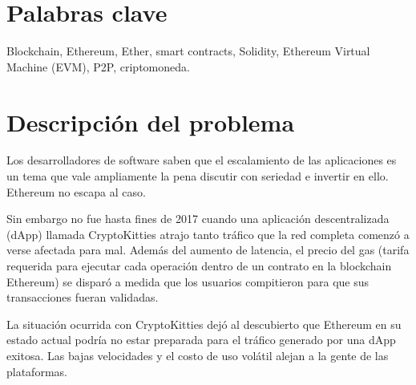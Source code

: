 \nomenclature[g-p]{$\pi$}{ $\simeq 3.14\ldots$}                                             %


\section{Palabras clave} %
Blockchain, Ethereum, Ether, smart contracts, Solidity, Ethereum Virtual Machine (EVM), P2P,
criptomoneda.

\section{Descripción del problema} %
Los desarrolladores de software saben que el escalamiento de las aplicaciones es un tema
que vale ampliamente la pena discutir con seriedad e invertir en ello. Ethereum no escapa
al caso.

Sin embargo no fue hasta fines de 2017 cuando una aplicación descentralizada (dApp) llamada
CryptoKitties atrajo tanto tráfico que la red completa comenzó a verse afectada para mal.
Además del aumento de latencia, el precio del gas (tarifa requerida para ejecutar cada
operación dentro de un contrato en la blockchain Ethereum) se disparó a medida que los
usuarios compitieron para que sus transacciones fueran validadas.

La situación ocurrida con CryptoKitties dejó al descubierto que Ethereum en su estado
actual podría no estar preparada para el tráfico generado por una dApp exitosa.
Las bajas velocidades y el costo de uso volátil alejan a la gente de las plataformas.

